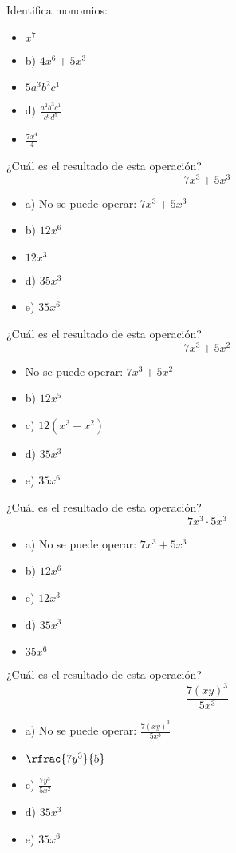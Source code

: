 \newpreg Identifica monomios:

\begin{itemize}
\item {} $x^7$
\item b) $4x^6+5x^3$
\item {} $5a^3b^2c^1$
\item d) $\frac{a^2b^3c^1}{c^6d^5}$
\item {} $\frac{7x^4}{4}$
\end{itemize}


\newpreg ¿Cuál es el resultado de esta operación?
\[
	7x^3+5x^3
\]

\begin{itemize}
	\item a) No se puede operar: $7x^3+5x^3$
	\item b) $12x^6$
	\item {} $12x^3$
	\item d) $35x^3$
	\item e) $35x^6$
\end{itemize}

\newpreg ¿Cuál es el resultado de esta operación?
\[
	7x^3+5x^2
\]

\begin{itemize}
	\item {}No se puede operar:  $7x^3+5x^2$
	\item b) $12x^5$
	\item c) $12(x^3+x^2)$
	\item d) $35x^3$
	\item e) $35x^6$
\end{itemize}

\newpreg ¿Cuál es el resultado de esta operación?
\[
	7x^3·5x^3
\]

\begin{itemize}
	\item a) No se puede operar: $7x^3+5x^3$
	\item b) $12x^6$
	\item c) $12x^3$
	\item d) $35x^3$
	\item {} $35x^6$
\end{itemize}


\newpreg ¿Cuál es el resultado de esta operación?
\[
	\frac{7(xy)^3}{5x^3}
\]

\begin{itemize}
	\item a) No se puede operar: $\frac{7(xy)^3}{5x^3}$
	\item {} $\rfrac{7y^3}{5}$
	\item c) $\frac{7y^3}{5x^2}$
	\item d) $35x^3$
	\item e) $35x^6$
\end{itemize}

